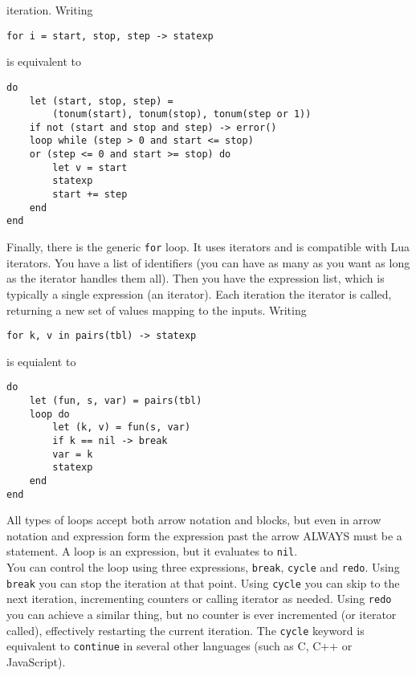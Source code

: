 \documentclass{article}
\begin{document}
iteration. Writing
\begin{lstlisting}[language=vortex]
for i = start, stop, step -> statexp
\end{lstlisting}
is equivalent to
\begin{lstlisting}[language=vortex]
do
    let (start, stop, step) =
        (tonum(start), tonum(stop), tonum(step or 1))
    if not (start and stop and step) -> error()
    loop while (step > 0 and start <= stop)
    or (step <= 0 and start >= stop) do
        let v = start
        statexp
        start += step
    end
end
\end{lstlisting}
Finally, there is the generic \verb|for| loop. It uses iterators and is
compatible with Lua iterators. You have a list of identifiers (you can have
as many as you want as long as the iterator handles them all). Then you have
the expression list, which is typically a single expression (an iterator).
Each iteration the iterator is called, returning a new set of values mapping
to the inputs. Writing
\begin{lstlisting}[language=vortex]
for k, v in pairs(tbl) -> statexp
\end{lstlisting}
is equialent to
\begin{lstlisting}[language=vortex]
do
    let (fun, s, var) = pairs(tbl)
    loop do
        let (k, v) = fun(s, var)
        if k == nil -> break
        var = k
        statexp
    end
end
\end{lstlisting}
All types of loops accept both arrow notation and blocks, but even in arrow
notation and expression form the expression past the arrow ALWAYS must be
a statement. A loop is an expression, but it evaluates to \verb|nil|.\\
You can control the loop using three expressions, \verb|break|, \verb|cycle|
and \verb|redo|. Using \verb|break| you can stop the iteration at that point.
Using \verb|cycle| you can skip to the next iteration, incrementing counters
or calling iterator as needed. Using \verb|redo| you can achieve a similar
thing, but no counter is ever incremented (or iterator called), effectively
restarting the current iteration. The \verb|cycle| keyword is equivalent to
\verb|continue| in several other languages (such as C, C++ or JavaScript).
\end{document}
